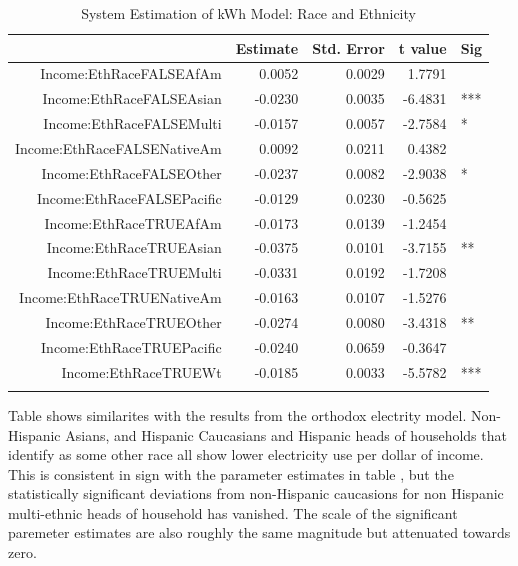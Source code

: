 \documentclass{article}
\begin{document}
{\small
\begin{longtable}{rrrrl}
\caption{System Estimation of kWh Model: Race and Ethnicity} \\ 
  \hline
 & Estimate & Std. Error & t value & Sig \\ 
  \hline
Income:EthRaceFALSEAfAm & 0.0052 & 0.0029 & 1.7791 &   \\ 
  Income:EthRaceFALSEAsian & -0.0230 & 0.0035 & -6.4831 & *** \\ 
  Income:EthRaceFALSEMulti & -0.0157 & 0.0057 & -2.7584 & * \\ 
  Income:EthRaceFALSENativeAm & 0.0092 & 0.0211 & 0.4382 &   \\ 
  Income:EthRaceFALSEOther & -0.0237 & 0.0082 & -2.9038 & * \\ 
  Income:EthRaceFALSEPacific & -0.0129 & 0.0230 & -0.5625 &   \\ 
  Income:EthRaceTRUEAfAm & -0.0173 & 0.0139 & -1.2454 &   \\ 
  Income:EthRaceTRUEAsian & -0.0375 & 0.0101 & -3.7155 & ** \\ 
  Income:EthRaceTRUEMulti & -0.0331 & 0.0192 & -1.7208 &   \\ 
  Income:EthRaceTRUENativeAm & -0.0163 & 0.0107 & -1.5276 &   \\ 
  Income:EthRaceTRUEOther & -0.0274 & 0.0080 & -3.4318 & ** \\ 
  Income:EthRaceTRUEPacific & -0.0240 & 0.0659 & -0.3647 &   \\ 
  Income:EthRaceTRUEWt & -0.0185 & 0.0033 & -5.5782 & *** \\ 
   \hline
\hline
\label{tab:SystemKWHEthnicity}
\end{longtable}
}
Table 
shows similarites with the results from the orthodox electrity model.  Non-Hispanic Asians, and Hispanic Caucasians and Hispanic heads of households that identify as some other race all show lower electricity use per dollar of income.   This is consistent in sign with the parameter estimates in table 
, but the statistically significant deviations from non-Hispanic caucasions for non Hispanic multi-ethnic heads of household has vanished.  The scale of the significant paremeter estimates are also roughly the same magnitude but attenuated towards zero.
\end{document}
